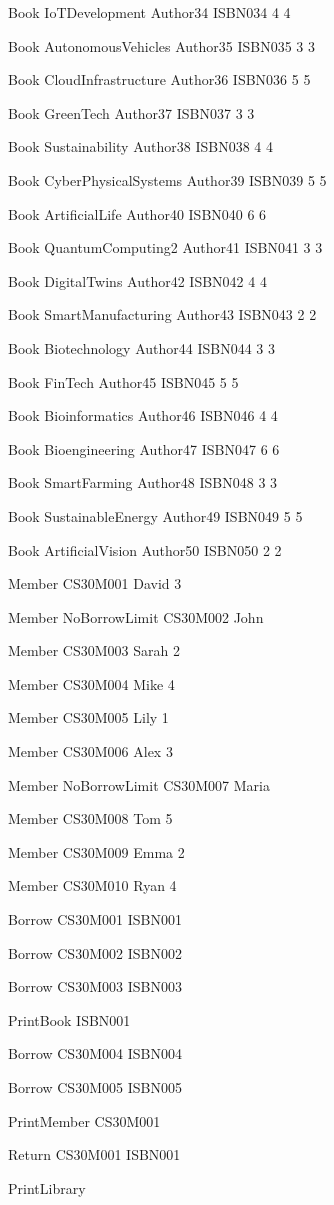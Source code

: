 Book
IoTDevelopment Author34 ISBN034 4 4

Book
AutonomousVehicles Author35 ISBN035 3 3

Book
CloudInfrastructure Author36 ISBN036 5 5

Book
GreenTech Author37 ISBN037 3 3

Book
Sustainability Author38 ISBN038 4 4

Book
CyberPhysicalSystems Author39 ISBN039 5 5

Book
ArtificialLife Author40 ISBN040 6 6

Book
QuantumComputing2 Author41 ISBN041 3 3

Book
DigitalTwins Author42 ISBN042 4 4

Book
SmartManufacturing Author43 ISBN043 2 2

Book
Biotechnology Author44 ISBN044 3 3

Book
FinTech Author45 ISBN045 5 5

Book
Bioinformatics Author46 ISBN046 4 4

Book
Bioengineering Author47 ISBN047 6 6

Book
SmartFarming Author48 ISBN048 3 3

Book
SustainableEnergy Author49 ISBN049 5 5

Book
ArtificialVision Author50 ISBN050 2 2

Member
CS30M001 David 3

Member
NoBorrowLimit CS30M002 John

Member
CS30M003 Sarah 2

Member
CS30M004 Mike 4

Member
CS30M005 Lily 1

Member
CS30M006 Alex 3

Member
NoBorrowLimit CS30M007 Maria

Member
CS30M008 Tom 5

Member
CS30M009 Emma 2

Member
CS30M010 Ryan 4

Borrow
CS30M001 ISBN001

Borrow
CS30M002 ISBN002

Borrow
CS30M003 ISBN003

PrintBook
ISBN001

Borrow
CS30M004 ISBN004

Borrow
CS30M005 ISBN005

PrintMember
CS30M001

Return
CS30M001 ISBN001

PrintLibrary

